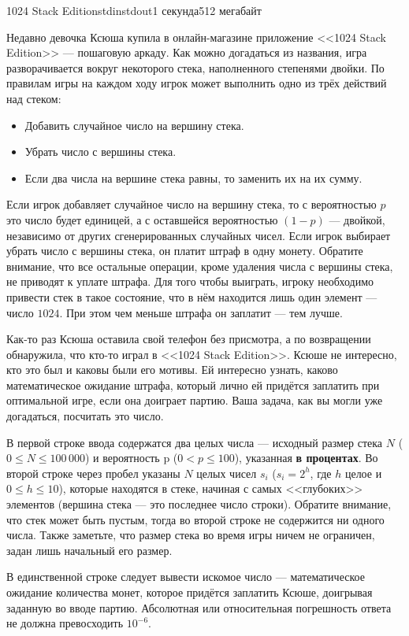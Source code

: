 \begin{problem}{1024 Stack Edition}{stdin}{stdout}{1 секунда}{512 мегабайт}

Недавно девочка Ксюша купила в онлайн-магазине приложение <<1024 Stack Edition>> --- пошаговую аркаду. Как можно догадаться из названия, игра разворачивается вокруг некоторого стека, наполненного степенями двойки. По правилам игры на каждом ходу игрок может выполнить одно из трёх действий над стеком:
\begin{itemize}
\item Добавить случайное число на вершину стека.
\item Убрать число с вершины стека.
\item Если два числа на вершине стека равны, то заменить их на их сумму.
\end{itemize}

Если игрок добавляет случайное число на вершину стека, то с вероятностью $p$ это число будет единицей, а с оставшейся вероятностью $(1 - p)$ --- двойкой, независимо от других сгенерированных случайных чисел. Если игрок выбирает убрать число с вершины стека, он платит штраф в одну монету. Обратите внимание, что все остальные операции, кроме удаления числа с вершины стека, не приводят к уплате штрафа. Для того чтобы выиграть, игроку необходимо привести стек в такое состояние, что в нём находится лишь один элемент --- число $1024$. При этом чем меньше штрафа он заплатит --- тем лучше.

Как-то раз Ксюша оставила свой телефон без присмотра, а по возвращении обнаружила, что кто-то играл в <<1024 Stack Edition>>.  Ксюше не интересно, кто это был и каковы были его мотивы. Ей интересно узнать, каково математическое ожидание штрафа, который лично ей придётся заплатить при оптимальной игре, если она доиграет партию. Ваша задача, как вы могли уже догадаться, посчитать это число.


\InputFile
В первой строке ввода содержатся два целых числа --- исходный размер стека $N$ ($0 \le N \le 100\,000$) и вероятность p ($0 < p \le 100$), указанная \textbf{в процентах}. Во второй строке через пробел указаны $N$ целых чисел $s_i$ ($s_i = 2^h$, где $h$ целое и $0 \le h \le 10$), которые находятся в стеке, начиная с самых <<глубоких>> элементов (вершина стека --- это последнее число строки). Обратите внимание, что стек может быть пустым, тогда во второй строке не содержится ни одного числа. Также заметьте, что размер стека во время игры ничем не ограничен, задан лишь начальный его размер.

\OutputFile
В единственной строке следует вывести искомое число --- математическое ожидание количества монет, которое придётся заплатить Ксюше, доигрывая заданную во вводе партию. Абсолютная или относительная погрешность ответа не должна превосходить $10^{-6}$.

\Examples

\begin{example}
%
%
\end{example}

\end{problem}
